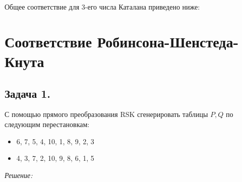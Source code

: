 Общее соответствие для 3-его числа Каталана приведено ниже:
\begin{figure}[H]
\end{figure}

\newpage

\section{Соответствие Робинсона-Шенстеда-Кнута}

\subsection*{Задача 1.}

С помощью прямого преобразования RSK сгенерировать таблицы $P, Q$ по следующим перестановкам:
\begin{itemize}
	\item 6, 7, 5, 4, 10, 1, 8, 9, 2, 3
	\item 4, 3, 7, 2, 10, 9, 8, 6, 1, 5
\end{itemize}

\noindent\textit{Решение:}

